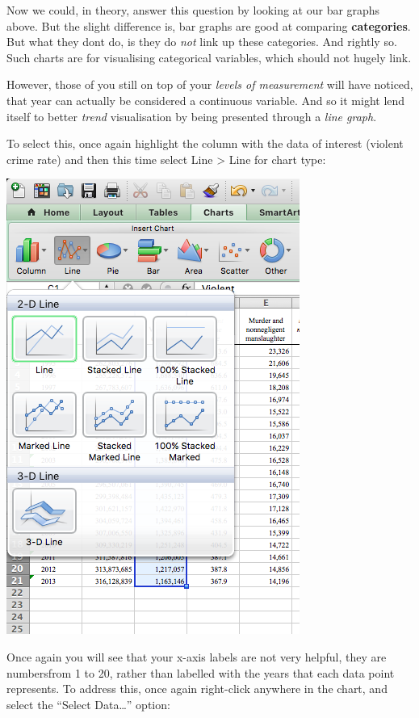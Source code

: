 \documentclass[
]{book}
\begin{document}
Now we could, in theory, answer this question by looking at our bar graphs above. But the slight difference is, bar graphs are good at comparing \textbf{categories}. But what they dont do, is they do \emph{not} link up these categories. And rightly so. Such charts are for visualising categorical variables, which should not hugely link.

However, those of you still on top of your \emph{levels of measurement} will have noticed, that year can actually be considered a continuous variable. And so it might lend itself to better \emph{trend} visualisation by being presented through a \emph{line graph}.

To select this, once again highlight the column with the data of interest (violent crime rate) and then this time select Line \textgreater{} Line for chart type:

\includegraphics{imgs/desc_line_1.png}

Once again you will see that your x-axis labels are not very helpful, they are numbersfrom 1 to 20, rather than labelled with the years that each data point represents. To address this, once again right-click anywhere in the chart, and select the ``Select Data\ldots{}'' option:
\end{document}
